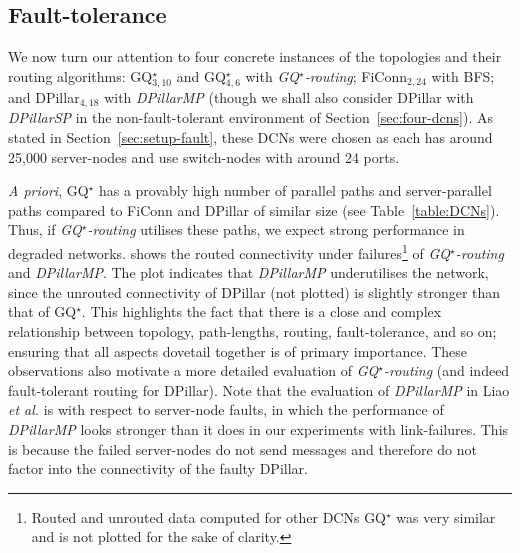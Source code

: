 \documentclass[]{amsart}
\begin{document}
{\subsection{Fault-tolerance}
\label{sec:evaluate-fault-tolerance}

We now turn our attention to four concrete instances of the topologies and their routing algorithms: GQ$^\star_{3,10}$ and GQ$^\star_{4,6}$ with \emph{GQ$^\star$-routing\/}; FiConn$_{2,24}$ with BFS; and DPillar$_{4,18}$ with \emph{DPillarMP\/} (though we shall also consider DPillar with \emph{DPillarSP\/} in the non-fault-tolerant environment of Section~\ref{sec:four-dcns}).  As stated in Section~\ref{sec:setup-fault}, these DCNs were chosen as each has around 25,000 server-nodes and use switch-nodes with around 24 ports.  

\emph{A priori}, GQ$^\star$ has a provably high number of parallel
paths and server-parallel paths compared to FiConn and DPillar of
similar size (see Table~\ref{table:DCNs}).  Thus, if \emph{GQ$^\star$-routing\/}
utilises these paths, we expect strong performance in degraded
networks.   shows the
routed connectivity under failures\footnote{Routed and unrouted data
  computed for other DCNs GQ$^\star$ was very similar and is not plotted
  for the sake of clarity.} of \emph{GQ$^\star$-routing\/}
and \emph{DPillarMP\/}.  The plot indicates that \emph{DPillarMP\/}
underutilises the network, since the unrouted connectivity of
DPillar (not plotted) is slightly stronger than that of GQ$^\star$.
This highlights the fact that there is a close and complex relationship between topology, path-lengths, routing, fault-tolerance, and so on; ensuring that all aspects dovetail together is of primary importance. These observations also motivate a more detailed
evaluation of \emph{GQ$^\star$-routing\/} (and indeed fault-tolerant routing for
DPillar). Note that the evaluation of \emph{DPillarMP\/} in Liao \emph{et al.}
\cite{LiaoYinYin2012} is with respect to server-node faults, in which the
performance of \emph{DPillarMP\/} looks stronger than it does in our
experiments with link-failures.  This is because the failed server-nodes do
not send messages and therefore do not factor into the connectivity of
the faulty DPillar.

\begin{figure}[ht]
  {\centering


}
\end{figure}}
\end{document}
